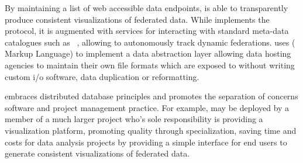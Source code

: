 By maintaining a list of web accessible data endpoints, \sciwms{} is
able to transparently produce consistent visualizations of federated
data. While \sciwms{} implements the \ogc{} \wms{} protocol, it is
augmented with services for interacting with standard meta-data
catalogues such as \csw{}~\cite{csw14}, allowing \sciwms{} to
autonomously track dynamic federations. \sciwms{} uses \ncml{}
(\netcdf{} Markup Language) to implement a data abstraction layer
allowing data hosting agencies to maintain their own file formats
which are exposed to \sciwms{} without writing custom i/o software, data
duplication or reformatting.

\sciwms{} embraces distributed database principles and promotes the
separation of concerns software and project management practice. For
example, \sciwms{} may be deployed by a member of a much larger
project who's sole responsibility is providing a visualization
platform, promoting quality through specialization, saving time and
costs for data analysis projects by providing a simple interface for
end users to generate consistent visualizations of federated data.
